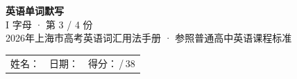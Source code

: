 \documentclass[10pt,a4paper]{article}
\begin{document}
\pagestyle{plain}

\begin{center}
{\LARGE\bfseries 英语单词默写}\\[0.22em]
{\large I 字母 · 第 3 / 4 份}\\[0.18em]
{\small 2026年上海市高考英语词汇用法手册 · 参照普通高中英语课程标准}
\end{center}

\vspace{0.25em}
\noindent\begin{tabular}{@{}p{}@{}p{}@{}p{}@{}}
姓名：\underline{\hspace{2.0cm}} & 日期：\underline{\hspace{2.0cm}} & 得分：\underline{\hspace{1.3cm}}\,/\,38 \\
\end{tabular}

\vspace{0.3em}

\vspace{0.08em}
\end{document}
